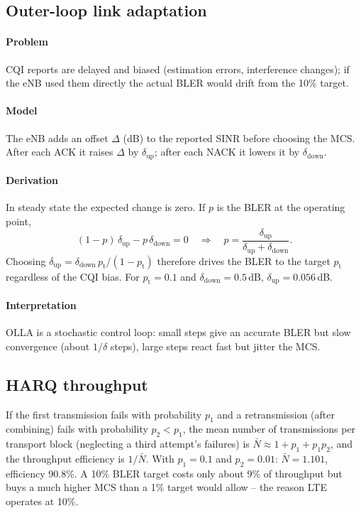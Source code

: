 \documentclass[11pt,a4paper]{article}
\begin{document}
\subsection{Outer-loop link adaptation}\label{sec:olla}
\paragraph{Problem} CQI reports are delayed and biased (estimation errors, interference changes); if
the eNB used them directly the actual BLER would drift from the 10\% target.
\paragraph{Model} The eNB adds an offset $\Delta$ (dB) to the reported SINR before choosing the MCS.
After each ACK it raises $\Delta$ by $\delta_{\mathrm{up}}$; after each NACK it lowers it by
$\delta_{\mathrm{down}}$.
\paragraph{Derivation} In steady state the expected change is zero. If $p$ is the BLER at the
operating point,
\begin{equation}\label{eq:olla}
  (1-p)\,\delta_{\mathrm{up}} - p\,\delta_{\mathrm{down}} = 0
  \quad\Longrightarrow\quad
  p = \frac{\delta_{\mathrm{up}}}{\delta_{\mathrm{up}}+\delta_{\mathrm{down}}}.
\end{equation}
Choosing $\delta_{\mathrm{up}} = \delta_{\mathrm{down}}\,p_\mathrm{t}/(1-p_\mathrm{t})$ therefore drives the
BLER to the target $p_\mathrm{t}$ regardless of the CQI bias. For $p_\mathrm{t} = 0.1$ and
$\delta_{\mathrm{down}} = 0.5$\,dB, $\delta_{\mathrm{up}} = 0.056$\,dB.
\paragraph{Interpretation} OLLA is a stochastic control loop: small steps give an accurate BLER but
slow convergence (about $1/\delta$ steps), large steps react fast but jitter the MCS.

\subsection{HARQ throughput}
If the first transmission fails with probability $p_1$ and a retransmission (after combining) fails
with probability $p_2 < p_1$, the mean number of transmissions per transport block (neglecting a
third attempt's failures) is $\bar N \approx 1 + p_1 + p_1p_2$, and the throughput efficiency is
$1/\bar N$. With $p_1 = 0.1$ and $p_2 = 0.01$: $\bar N = 1.101$, efficiency 90.8\%. A 10\% BLER target
costs only about 9\% of throughput but buys a much higher MCS than a 1\% target would allow -- the
reason LTE operates at 10\%.
\end{document}
